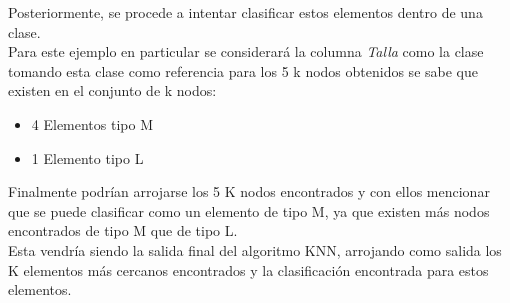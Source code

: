 Posteriormente, se procede a intentar clasificar estos elementos dentro de una clase.\\
Para este ejemplo en particular se considerará la columna \emph{Talla} como la clase tomando esta clase como referencia para los 5 k nodos obtenidos se sabe que existen en el conjunto de k nodos:
\begin{itemize}
	\item 4 Elementos tipo M
	\item 1 Elemento tipo L 
\end{itemize}
Finalmente podrían arrojarse los 5 K nodos encontrados y con ellos mencionar que se puede clasificar como un elemento de tipo M, ya que existen más nodos encontrados de tipo M que de tipo L.
\\
Esta vendría siendo la salida final del algoritmo KNN, arrojando como salida los K elementos más cercanos encontrados y la clasificación encontrada para estos elementos. 
\newpage
